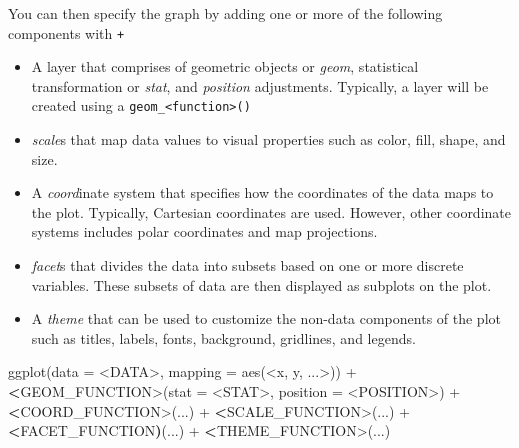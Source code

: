 \documentclass[
]{book}
\newenvironment{Shaded}{\begin{snugshade}}{\end{snugshade}}
\newcommand{\AttributeTok}[1]{\textcolor[rgb]{0.77,0.63,0.00}{#1}}
\newcommand{\ErrorTok}[1]{\textcolor[rgb]{0.64,0.00,0.00}{\textbf{#1}}}
\newcommand{\FunctionTok}[1]{\textcolor[rgb]{0.00,0.00,0.00}{#1}}
\newcommand{\NormalTok}[1]{#1}
\newcommand{\SpecialCharTok}[1]{\textcolor[rgb]{0.00,0.00,0.00}{#1}}
\providecommand{\tightlist}{%
  \setlength{\itemsep}{0pt}\setlength{\parskip}{0pt}}
\begin{document}
You can then specify the graph by adding one or more of the following components with \texttt{+}

\begin{itemize}
\tightlist
\item
  A layer that comprises of geometric objects or \emph{geom}, statistical transformation or \emph{stat}, and \emph{position} adjustments. Typically, a layer will be created using a \texttt{geom\_\textless{}function\textgreater{}()}
\item
  \emph{scale}s that map data values to visual properties such as color, fill, shape, and size.
\item
  A \emph{coord}inate system that specifies how the coordinates of the data maps to the plot. Typically, Cartesian coordinates are used. However, other coordinate systems includes polar coordinates and map projections.
\item
  \emph{facet}s that divides the data into subsets based on one or more discrete variables. These subsets of data are then displayed as subplots on the plot.
\item
  A \emph{theme} that can be used to customize the non-data components of the plot such as titles, labels, fonts, background, gridlines, and legends.
\end{itemize}

\begin{Shaded}
\begin{Highlighting}[]
\FunctionTok{ggplot}\NormalTok{(}\AttributeTok{data =} \SpecialCharTok{\textless{}}\NormalTok{DATA}\SpecialCharTok{\textgreater{}}\NormalTok{, }\AttributeTok{mapping =} \FunctionTok{aes}\NormalTok{(}\SpecialCharTok{\textless{}}\NormalTok{x, y, ...}\SpecialCharTok{\textgreater{}}\NormalTok{)) }\SpecialCharTok{+}
    \ErrorTok{\textless{}}\NormalTok{GEOM\_FUNCTION}\SpecialCharTok{\textgreater{}}\NormalTok{(}\AttributeTok{stat =} \SpecialCharTok{\textless{}}\NormalTok{STAT}\SpecialCharTok{\textgreater{}}\NormalTok{, }\AttributeTok{position =} \SpecialCharTok{\textless{}}\NormalTok{POSITION}\SpecialCharTok{\textgreater{}}\NormalTok{) }\SpecialCharTok{+}
    \ErrorTok{\textless{}}\NormalTok{COORD\_FUNCTION}\SpecialCharTok{\textgreater{}}\NormalTok{(...) }\SpecialCharTok{+}
    \ErrorTok{\textless{}}\NormalTok{SCALE\_FUNCTION}\SpecialCharTok{\textgreater{}}\NormalTok{(...) }\SpecialCharTok{+}
    \ErrorTok{\textless{}}\NormalTok{FACET\_FUNCTION}\ErrorTok{)}\NormalTok{(...) }\SpecialCharTok{+}
    \ErrorTok{\textless{}}\NormalTok{THEME\_FUNCTION}\SpecialCharTok{\textgreater{}}\NormalTok{(...)}
\end{Highlighting}
\end{Shaded}
\end{document}
